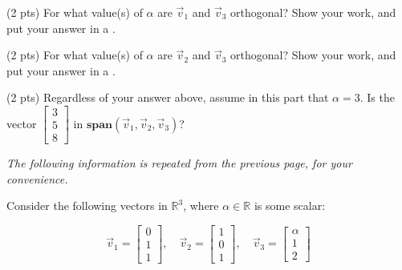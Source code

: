\documentclass[twoside,12pt]{article}
\begin{document}
\begin{probset}
\begin{prob}
\begin{subprobset}
\begin{subprob}
\begin{responsebox}{1.32in}
\end{responsebox}
    \end{subprob}
    
    \begin{subprob}(2 pts)
        For what value(s) of $\alpha$ are $\vec{v}_1$ and $\vec{v}_3$ orthogonal? Show your work, and put your answer in a . 

\begin{responsebox}{1.32in}

\end{responsebox}
    \end{subprob}
    
    \begin{subprob}(2 pts)
        For what value(s) of $\alpha$ are $\vec{v}_2$ and $\vec{v}_3$ orthogonal? Show your work, and put your answer in a . 

\begin{responsebox}{1.32in}

\end{responsebox}
    \end{subprob}

    \begin{subprob}(2 pts)
        Regardless of your answer above, assume in this part that $\alpha = 3$. Is the vector $\begin{bmatrix}
3 \\
5 \\
8
\end{bmatrix}$ in $\textbf{span}(\vec{v}_1, \vec{v}_2, \vec{v}_3)$?
\vspace{-0.3cm}
    \begin{center}
    \end{center}
    \end{subprob}
\end{subprobset}
\newpage 
\textit{The following information is repeated from the previous page, for your convenience.} 

Consider the following vectors in \( \mathbb{R}^3 \), where $\alpha \in \mathbb{R}$ is some scalar:

\[
\vec{v}_1 = \begin{bmatrix} 0 \\ 1 \\ 1 \end{bmatrix}, \quad 
\vec{v}_2 = \begin{bmatrix} 1 \\ 0 \\ 1 \end{bmatrix}, \quad 
\vec{v}_3 = \begin{bmatrix} \alpha \\ 1 \\ 2 \end{bmatrix}
            \]
\begin{subprobset}


\end{subprobset}
\end{prob}
\end{probset}
\end{document}
